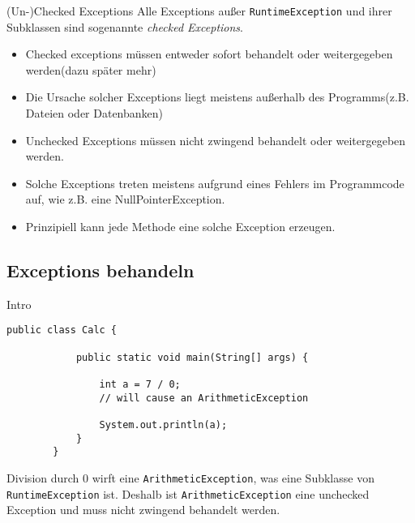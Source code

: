 \begin{frame}{(Un-)Checked Exceptions}
    Alle Exceptions außer \texttt{RuntimeException} und ihrer Subklassen sind sogenannte \textit{checked Exceptions}.
    \pause
    \begin{itemize}[<+->]
        \item Checked exceptions müssen entweder sofort behandelt oder weitergegeben werden(dazu später mehr)
        \item Die Ursache solcher Exceptions liegt meistens außerhalb des Programms(z.B. Dateien oder Datenbanken)
    \end{itemize}
    \begin{itemize}[<+->]
        \item Unchecked Exceptions müssen nicht zwingend behandelt oder weitergegeben werden.
        \item Solche Exceptions treten meistens aufgrund eines Fehlers im Programmcode auf, wie z.B. eine NullPointerException.
        \item Prinzipiell kann jede Methode eine solche Exception erzeugen.
    \end{itemize}
\end{frame}

\subsection{Exceptions behandeln}
\begin{frame}[fragile]{Intro}
    \begin{lstlisting}[gobble=8]
        public class Calc {

            public static void main(String[] args) {

                int a = 7 / 0;
                // will cause an ArithmeticException

                System.out.println(a);
            }
        }
    \end{lstlisting}
    Division durch 0 wirft eine \texttt{ArithmeticException}, was eine Subklasse von \texttt{RuntimeException} ist.
    Deshalb ist \texttt{ArithmeticException} eine unchecked Exception und muss nicht zwingend behandelt werden.
\end{frame}

